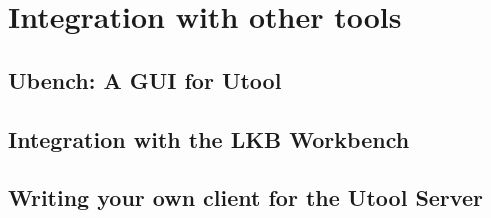 \section{Integration with other tools}  \label{sec:integration}


\subsection{Ubench: A GUI for Utool}

\subsection{Integration with the LKB Workbench}

\subsection{Writing your own client for the Utool Server}



